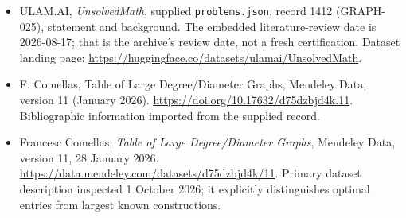 \documentclass[11pt,a4paper]{article}
\begin{document}
{\small

\begin{itemize}

\item[\hypertarget{source:1412:1}{S1}] ULAM.AI, \emph{UnsolvedMath}, supplied \texttt{problems.json}, record 1412 (GRAPH-025), statement and background. The embedded literature-review date is 2026-08-17; that is the archive’s review date, not a fresh certification. Dataset landing page: \url{https://huggingface.co/datasets/ulamai/UnsolvedMath}.

\item[\hypertarget{source:1412:2}{S2}] F. Comellas, Table of Large Degree/Diameter Graphs, Mendeley Data, version 11 (January 2026). \url{https://doi.org/10.17632/d75dzbjd4k.11}. Bibliographic information imported from the supplied record.


\item[E1] Francesc Comellas, \emph{Table of Large
Degree/Diameter Graphs}, Mendeley Data, version 11, 28 January 2026.
\url{https://data.mendeley.com/datasets/d75dzbjd4k/11}.
Primary dataset description inspected 1 October 2026; it explicitly
distinguishes optimal entries from largest known constructions.

\end{itemize}

}

\label{end:1412}
\end{document}
